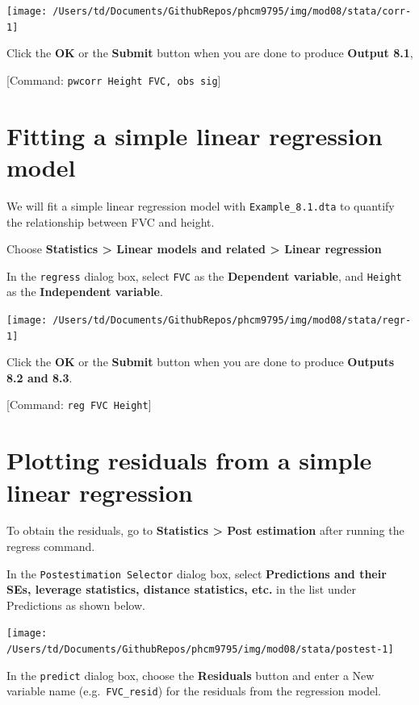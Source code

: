 \documentclass[
]{memoir}
\begin{document}
\texttt{[image: /Users/td/Documents/GithubRepos/phcm9795/img/mod08/stata/corr-1]}

Click the \textbf{OK} or the \textbf{Submit} button when you are done to produce \textbf{Output 8.1},

{[}Command: \texttt{pwcorr\ Height\ FVC,\ obs\ sig}{]}

\hypertarget{fitting-a-simple-linear-regression-model}{%
\section{Fitting a simple linear regression model}\label{fitting-a-simple-linear-regression-model}}

We will fit a simple linear regression model with \texttt{Example\_8.1.dta} to quantify the relationship between FVC and height.

Choose \textbf{Statistics \textgreater{} Linear models and related \textgreater{} Linear regression}

In the \texttt{regress} dialog box, select \texttt{FVC} as the \textbf{Dependent variable}, and \texttt{Height} as the \textbf{Independent variable}.

\texttt{[image: /Users/td/Documents/GithubRepos/phcm9795/img/mod08/stata/regr-1]}

Click the \textbf{OK} or the \textbf{Submit} button when you are done to produce \textbf{Outputs 8.2 and 8.3}.

{[}Command: \texttt{reg\ FVC\ Height}{]}

\hypertarget{plotting-residuals-from-a-simple-linear-regression}{%
\section{Plotting residuals from a simple linear regression}\label{plotting-residuals-from-a-simple-linear-regression}}

To obtain the residuals, go to \textbf{Statistics \textgreater{} Post estimation} after running the regress command.

In the \texttt{Postestimation\ Selector} dialog box, select \textbf{Predictions and their SEs, leverage statistics, distance statistics, etc.} in the list under Predictions as shown below.

\texttt{[image: /Users/td/Documents/GithubRepos/phcm9795/img/mod08/stata/postest-1]}

In the \texttt{predict} dialog box, choose the \textbf{Residuals} button and enter a New variable name (e.g.~\texttt{FVC\_resid}) for the residuals from the regression model.
\end{document}
